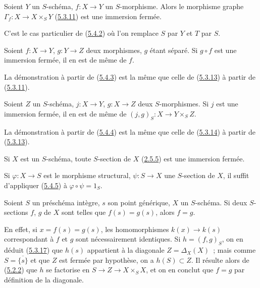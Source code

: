 \begin{corollary}[5.4.3]
\label{I.5.4.3-fr}
Soient $Y$ un $S$-schéma, $f:X\to Y$ un $S$-morphisme. Alors le morphisme
graphe $\Gamma_f:X\to X\times_S Y$ (\hyperref[I.5.3.11-fr]{5.3.11}) est une
immersion fermée.
\end{corollary}

C'est le cas particulier de (\hyperref[I.5.4.2-fr]{5.4.2}) où l'on remplace
$S$ par $Y$ et $T$ par $S$.

\begin{corollary}[5.4.4]
\label{I.5.4.4-fr}
Soient $f:X\to Y$, $g:Y\to Z$ deux morphismes, $g$ étant séparé. Si $g\circ f$
est une immersion fermée, il en est de même de $f$.
\end{corollary}

La démonstration à partir de (\hyperref[I.5.4.3-fr]{5.4.3}) est la même que
celle de (\hyperref[I.5.3.13-fr]{5.3.13}) à partir de
(\hyperref[I.5.3.11-fr]{5.3.11}).

\begin{corollary}[5.4.5]
\label{I.5.4.5-fr}
Soient $Z$ un $S$-schéma, $j:X\to Y$, $g:X\to Z$ deux $S$-morphismes. Si $j$
est une immersion fermée, il en est de même de
$(j,g)_S:X\to Y\times_S Z$.
\end{corollary}

La démonstration à partir de (\hyperref[I.5.4.4-fr]{5.4.4}) est la même que
celle de (\hyperref[I.5.3.14-fr]{5.3.14}) à partir de
(\hyperref[I.5.3.13-fr]{5.3.13}).

\begin{corollary}[5.4.6]
\label{I.5.4.6-fr}
Si $X$ est un $S$-schéma, toute $S$-section de $X$
(\hyperref[I.2.5.5-fr]{2.5.5}) est une immersion fermée.
\end{corollary}

Si $\varphi:X\to S$ est le morphisme structural, $\psi:S\to X$ une
$S$-section de $X$, il suffit d'appliquer
(\hyperref[I.5.4.5-fr]{5.4.5}) à $\varphi\circ\psi=1_S$.

\begin{corollary}[5.4.7]
\label{I.5.4.7-fr}
Soient $S$ un préschéma intègre, $s$ son point générique, $X$ un $S$-schéma.
Si deux $S$-sections $f$, $g$ de $X$ sont telles que $f(s)=g(s)$, alors
$f=g$.
\end{corollary}

En effet, si $x=f(s)=g(s)$, les homomorphismes $k(x)\to k(s)$ correspondant à
$f$ et $g$ sont nécessairement identiques. Si $h=(f,g)_S$, on en déduit
(\hyperref[I.5.3.17-fr]{5.3.17}) que $h(s)$ appartient à la diagonale
$Z=\Delta_X(X)$~; mais comme $S=\overline{\{s\}}$ et que $Z$ est fermée par
hypothèse, on a $h(S)\subset Z$. Il résulte alors de
(\hyperref[I.5.2.2-fr]{5.2.2}) que $h$ se factorise en
$S\to Z\to X\times_S X$, et on en conclut que $f=g$ par définition de la
diagonale.

